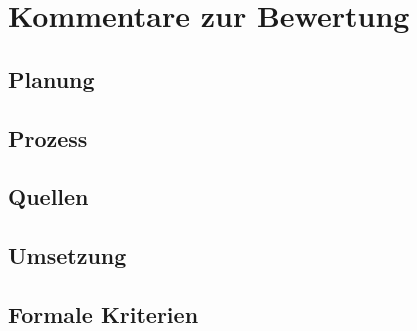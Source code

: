 \documentclass[12pt, a4]{article}
\begin{document}
\section*{Kommentare zur Bewertung}
\subsection*{Planung}
\fbox{%
  \parbox[b][0.5cm][c]{\textwidth}{\mbox{}}%
}

\subsection*{Prozess}
\fbox{%
  \parbox[b][3cm][c]{\textwidth}{\mbox{}}%
}
\subsection*{Quellen}
\fbox{%
  \parbox[b][3cm][c]{\textwidth}{\mbox{}}%
}
\subsection*{Umsetzung}
\fbox{%
  \parbox[b][3cm][c]{\textwidth}{\mbox{}}%
}
\subsection*{Formale Kriterien}
\fbox{%
  \parbox[b][0.5cm][c]{\textwidth}{\mbox{}}%
}
\end{document}
